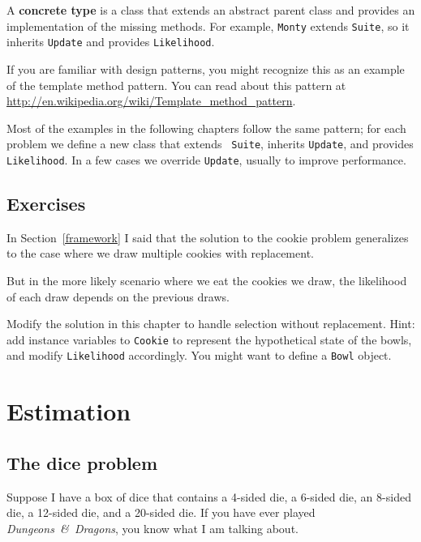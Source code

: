 \documentclass[12pt]{book}
\begin{document}
A {\bf concrete type} is a class that extends an abstract parent
class and provides an implementation of the missing methods.
For example, {\tt Monty} extends {\tt Suite}, so it inherits
{\tt Update} and provides {\tt Likelihood}.

If you are familiar with
design patterns, you might recognize this as an example of the
template method pattern.
You can read about this pattern at
\url{http://en.wikipedia.org/wiki/Template_method_pattern}.

Most of the examples in the following chapters follow the same
pattern; for each problem we define a new class that extends {\tt
  Suite}, inherits {\tt Update}, and provides {\tt Likelihood}.  In a
few cases we override {\tt Update}, usually to improve performance.

\section{Exercises}

\begin{exercise}

In Section~\ref{framework} I said that the solution to the cookie
problem generalizes to the case where we draw multiple cookies
with replacement.

But in the more likely scenario where we eat the cookies we draw,
the likelihood of each draw depends on the previous draws.

Modify the solution in this chapter to handle selection without
replacement.  Hint: add instance variables to {\tt Cookie} to
represent the hypothetical state of the bowls, and modify
{\tt Likelihood} accordingly.  You might want to define a 
{\tt Bowl} object.

\end{exercise}




\chapter{Estimation}
\label{estimation}

\section{The dice problem}

Suppose I have a box of dice that contains a 4-sided die, a 6-sided
die, an 8-sided die, a 12-sided die, and a 20-sided die.  If you
have ever played {\it Dungeons~\&~Dragons}, you know what I am talking about.
\end{document}
